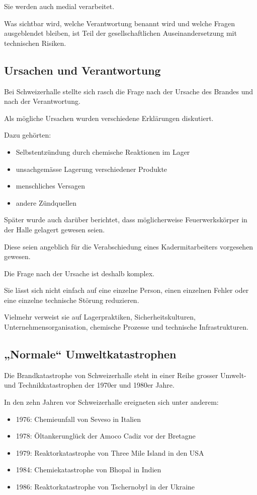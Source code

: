 Sie werden auch medial verarbeitet.

Was sichtbar wird,
welche Verantwortung benannt wird
und welche Fragen ausgeblendet bleiben,
ist Teil der gesellschaftlichen Auseinandersetzung
mit technischen Risiken.

\subsection{Ursachen und Verantwortung}

Bei Schweizerhalle stellte sich rasch
die Frage nach der Ursache des Brandes
und nach der Verantwortung.

Als mögliche Ursachen wurden
verschiedene Erklärungen diskutiert.

Dazu gehörten:

\begin{itemize}
\item Selbstentzündung durch chemische Reaktionen im Lager
\item unsachgemässe Lagerung verschiedener Produkte
\item menschliches Versagen
\item andere Zündquellen
\end{itemize}

Später wurde auch darüber berichtet,
dass möglicherweise Feuerwerkskörper
in der Halle gelagert gewesen seien.

Diese seien angeblich für die Verabschiedung
eines Kadermitarbeiters vorgesehen gewesen.

Die Frage nach der Ursache ist deshalb komplex.

Sie lässt sich nicht einfach
auf eine einzelne Person,
einen einzelnen Fehler
oder eine einzelne technische Störung reduzieren.

Vielmehr verweist sie
auf Lagerpraktiken,
Sicherheitskulturen,
Unternehmensorganisation,
chemische Prozesse
und technische Infrastrukturen.

\subsection{„Normale“ Umweltkatastrophen}

Die Brandkatastrophe von Schweizerhalle
steht in einer Reihe grosser Umwelt-
und Technikkatastrophen der 1970er und 1980er Jahre.

In den zehn Jahren vor Schweizerhalle
ereigneten sich unter anderem:

\begin{itemize}
\item 1976: Chemieunfall von Seveso in Italien
\item 1978: Öltankerunglück der Amoco Cadiz vor der Bretagne
\item 1979: Reaktorkatastrophe von Three Mile Island in den USA
\item 1984: Chemiekatastrophe von Bhopal in Indien
\item 1986: Reaktorkatastrophe von Tschernobyl in der Ukraine
\end{itemize}

